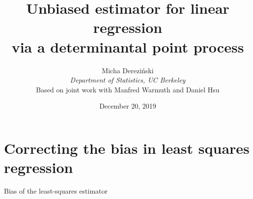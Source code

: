 \documentclass{beamer}
\title[]{Unbiased estimator for linear regression \\
via a determinantal point process}
\author[]{Micha{\polishl } Derezi\'{n}ski\\
  \textit{Department of Statistics, UC Berkeley}\\[4mm]
  \footnotesize Based on joint work with Manfred Warmuth and Daniel Hsu}
\date{December 20, 2019}
\begin{document}
\begin{frame}
  \titlepage
\end{frame}

\linespread{1.3}

\section{Correcting the bias in least squares regression}

\begin{frame}{Bias of the least-squares estimator}
\begin{columns}
\begin{column}{0.45\textwidth}
\end{column}
\end{columns}
\end{frame}
\end{document}
